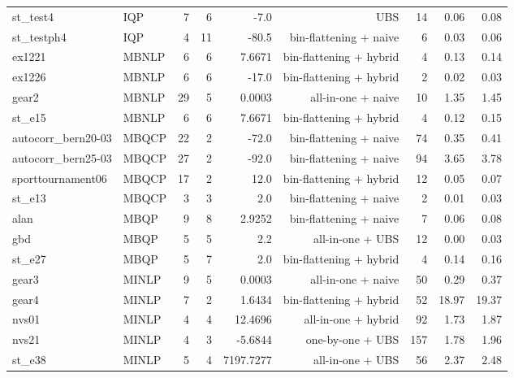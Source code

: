 \documentclass[a4paper,landscape]{article}
\begin{document}
\begin{center}
\begin{tabular}{|l|l|r|r|r|r|r|r|r|}
st\_test4 & IQP & 7 & 6 & -7.0 & UBS & 14 & 0.06 & 0.08 \\
st\_testph4 & IQP & 4 & 11 & -80.5 & bin-flattening + naive & 6 & 0.03 & 0.06 \\
ex1221 & MBNLP & 6 & 6 & 7.6671 & bin-flattening + hybrid & 4 & 0.13 & 0.14 \\
ex1226 & MBNLP & 6 & 6 & -17.0 & bin-flattening + hybrid & 2 & 0.02 & 0.03 \\
gear2 & MBNLP & 29 & 5 & 0.0003 & all-in-one + naive & 10 & 1.35 & 1.45 \\
st\_e15 & MBNLP & 6 & 6 & 7.6671 & bin-flattening + hybrid & 4 & 0.12 & 0.15 \\
autocorr\_bern20-03 & MBQCP & 22 & 2 & -72.0 & bin-flattening + naive & 74 & 0.35 & 0.41 \\
autocorr\_bern25-03 & MBQCP & 27 & 2 & -92.0 & bin-flattening + naive & 94 & 3.65 & 3.78 \\
sporttournament06 & MBQCP & 17 & 2 & 12.0 & bin-flattening + hybrid & 12 & 0.05 & 0.07 \\
st\_e13 & MBQCP & 3 & 3 & 2.0 & bin-flattening + naive & 2 & 0.01 & 0.03 \\
alan & MBQP & 9 & 8 & 2.9252 & bin-flattening + naive & 7 & 0.06 & 0.08 \\
gbd & MBQP & 5 & 5 & 2.2 & all-in-one + UBS & 12 & 0.00 & 0.03 \\
st\_e27 & MBQP & 5 & 7 & 2.0 & bin-flattening + hybrid & 4 & 0.14 & 0.16 \\
gear3 & MINLP & 9 & 5 & 0.0003 & all-in-one + naive & 50 & 0.29 & 0.37 \\
gear4 & MINLP & 7 & 2 & 1.6434 & bin-flattening + hybrid & 52 & 18.97 & 19.37 \\
nvs01 & MINLP & 4 & 4 & 12.4696 & all-in-one + hybrid & 92 & 1.73 & 1.87 \\
nvs21 & MINLP & 4 & 3 & -5.6844 & one-by-one + UBS & 157 & 1.78 & 1.96 \\
st\_e38 & MINLP & 5 & 4 & 7197.7277 & all-in-one + UBS & 56 & 2.37 & 2.48 \\
\hline  \end{tabular}
\end{center}
\newpage
\end{document}
